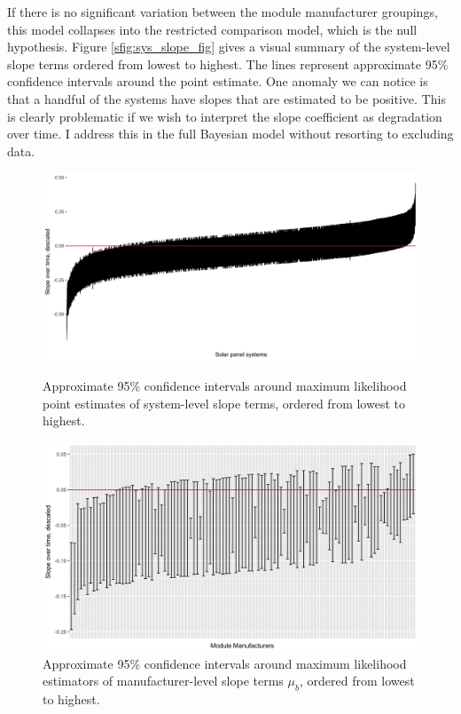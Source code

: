 \documentclass[12pt]{article}
\begin{document}
If there is no significant variation between the module manufacturer groupings, this model collapses into the restricted comparison model, which is the null hypothesis. Figure \ref{sfig:sys_slope_fig} gives a visual summary of the system-level slope terms ordered from lowest to highest. The lines represent approximate 95\% confidence intervals around the point estimate. One anomaly we can notice is that a handful of the systems have slopes that are estimated to be positive. This is clearly problematic if we wish to interpret the slope coefficient as degradation over time. I address this in the full Bayesian model without resorting to excluding data.

\begin{figure}
\begin{minipage}{.48\textwidth}
  \includegraphics[width=1\linewidth]{figures/sys_slope_fig.png}
  \caption{Approximate 95\% confidence intervals around maximum likelihood point estimates of system-level slope terms, ordered from lowest to highest.}
  \label{sfig:sys_slope_fig}
\end{minipage}\hfill
\begin{minipage}{.48\textwidth}
  \includegraphics[width=1\linewidth]{figures/nested_manuf_fig_final.png}
  \caption{Approximate 95\% confidence intervals around maximum likelihood estimators of manufacturer-level slope terms $\mu_b$, ordered from lowest to highest.}
  \label{sfig:nested_manuf_fig}
\end{minipage}
\end{figure}
\end{document}
